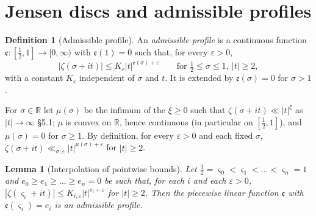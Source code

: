 \documentclass[11pt,reqno]{amsart}
\makeatletter
\let\CG@origcite\cite
\renewcommand*{\cite}[2][]{\def\CG@citekey{#2}%
  \ifx\relax#1\relax\CG@origcite{#2}\else\CG@origcite[#1]{#2}\fi}
\numberwithin{equation}{section}
\newtheorem{lemma}[theorem]{Lemma}
\theoremstyle{definition}
\newtheorem{definition}[theorem]{Definition}
\theoremstyle{remark}
\newcommand{\R}{\mathbb R}
\makeatother
\begin{document}
\section{Jensen discs and admissible profiles}\label{sec:jensen}

\begin{definition}[Admissible profile]\label{def:admissible}
An \emph{admissible profile} is a continuous function $\mathfrak e\colon[\frac12,1]\to[0,\infty)$ with $\mathfrak e(1)=0$ such that, for every $\varepsilon>0$,
\begin{equation}
|\zeta(\sigma+it)|\le K_\varepsilon|t|^{\mathfrak e(\sigma)+\varepsilon}\qquad\text{for }\tfrac12\le\sigma\le1,\ |t|\ge2,
\label{eq:admissible}
\end{equation}
with a constant $K_\varepsilon$ independent of $\sigma$ and $t$. It is extended by $\mathfrak e(\sigma)=0$ for $\sigma>1$.
\end{definition}

For $\sigma\in\R$ let $\mu(\sigma)$ be the infimum of the $\xi\ge0$ such that $\zeta(\sigma+it)\ll|t|^\xi$ as $|t|\to\infty$ \cite[\S5.1]{Titchmarsh1986}; $\mu$ is convex on $\R$, hence continuous (in particular on $[\frac12,1]$), and $\mu(\sigma)=0$ for $\sigma\ge1$. By definition, for every $\varepsilon>0$ and each fixed $\sigma$, $\zeta(\sigma+it)\ll_{\sigma,\varepsilon}|t|^{\mu(\sigma)+\varepsilon}$ for $|t|\ge2$.

\begin{lemma}[Interpolation of pointwise bounds]\label{lem:interpolation}
Let $\frac12=\varsigma_0<\varsigma_1<\dots<\varsigma_n=1$ and $e_0\ge e_1\ge\dots\ge e_n=0$ be such that, for each $i$ and each $\varepsilon>0$, $|\zeta(\varsigma_i+it)|\le K_{i,\varepsilon}|t|^{e_i+\varepsilon}$ for $|t|\ge2$. Then the piecewise linear function $\mathfrak e$ with $\mathfrak e(\varsigma_i)=e_i$ is an admissible profile.
\end{lemma}
\end{document}
